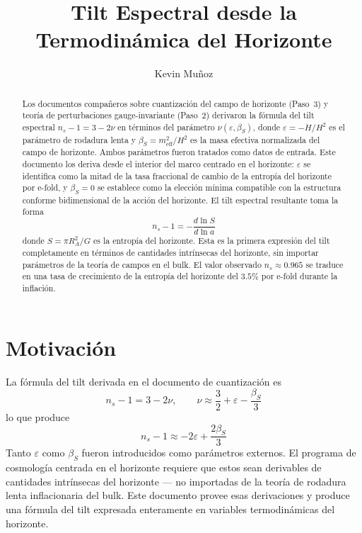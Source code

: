 \documentclass[12pt,a4paper]{article}
\title{Tilt Espectral desde la Termodin\'amica del Horizonte}
\author{Kevin Mu\~noz}
\date{}
\begin{document}
\maketitle

\begin{abstract}
Los documentos compañeros sobre cuantización del campo de horizonte (Paso~3) y teoría de perturbaciones gauge-invariante (Paso~2) derivaron la fórmula del tilt espectral $n_s - 1 = 3 - 2\nu$ en términos del parámetro $\nu(\varepsilon, \beta_S)$, donde $\varepsilon = -\dot{H}/H^2$ es el parámetro de rodadura lenta y $\beta_S = m_\text{eff}^2/H^2$ es la masa efectiva normalizada del campo de horizonte. Ambos parámetros fueron tratados como datos de entrada. Este documento los deriva desde el interior del marco centrado en el horizonte: $\varepsilon$ se identifica como la mitad de la tasa fraccional de cambio de la entropía del horizonte por e-fold, y $\beta_S = 0$ se establece como la elección mínima compatible con la estructura conforme bidimensional de la acción del horizonte. El tilt espectral resultante toma la forma
\[
n_s - 1 = -\frac{d\ln S}{d\ln a}
\]
donde $S = \pi R_A^2 / G$ es la entropía del horizonte. Esta es la primera expresión del tilt completamente en términos de cantidades intrínsecas del horizonte, sin importar parámetros de la teoría de campos en el bulk. El valor observado $n_s \approx 0.965$ se traduce en una tasa de crecimiento de la entropía del horizonte del $3.5\%$ por e-fold durante la inflación.
\end{abstract}

\section{Motivación}

La fórmula del tilt derivada en el documento de cuantización es
\begin{equation}
n_s - 1 = 3 - 2\nu, \qquad \nu \approx \frac{3}{2} + \varepsilon - \frac{\beta_S}{3} \tag{1}
\end{equation}
lo que produce
\begin{equation}
n_s - 1 \approx -2\varepsilon + \frac{2\beta_S}{3} \tag{2}
\end{equation}
Tanto $\varepsilon$ como $\beta_S$ fueron introducidos como parámetros externos. El programa de cosmología centrada en el horizonte requiere que estos sean derivables de cantidades intrínsecas del horizonte --- no importadas de la teoría de rodadura lenta inflacionaria del bulk. Este documento provee esas derivaciones y produce una fórmula del tilt expresada enteramente en variables termodinámicas del horizonte.
\end{document}
